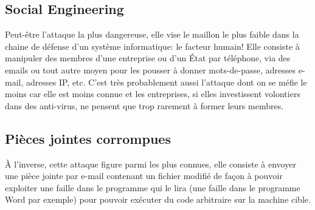\documentclass[article, french]{yReport}
\begin{document}
	\subsection{Social Engineering}
	Peut-être l'attaque la plus dangereuse, elle vise le maillon le plus faible dans la chaine de défense d'un système informatique: le facteur humain! Elle consiste à manipuler des membres d'une entreprise ou d'un État par téléphone, via des emails ou tout autre moyen pour les pousser à donner mots-de-passe, adresses e-mail, adresses IP, etc. C'est très probablement aussi l'attaque dont on se méfie le moins car elle est moins connue et les entreprises, si elles investissent volontiers dans des anti-virus, ne pensent que trop rarement à former leurs membres.
	
	\subsection{Pièces jointes corrompues}
	À l'inverse, cette attaque figure parmi les plus connues, elle consiste à envoyer une pièce jointe par e-mail contenant un fichier modifié de façon à pouvoir exploiter une faille dans le programme qui le lira (une faille dans le programme Word par exemple) pour pouvoir exécuter du code arbitraire sur la machine cible.
	
\end{document}
